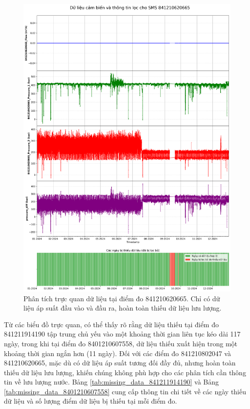 \begin{figure}[htbp]
    \centering
    \includegraphics[width=\textwidth]{image/section6_1/timeseries_combined_841210620665.png}
    \caption{Phân tích trực quan dữ liệu tại điểm đo 841210620665. Chỉ có dữ liệu áp suất đầu vào và đầu ra, hoàn toàn thiếu dữ liệu lưu lượng.}
    \label{fig:no_flow_data_841210620665}
\end{figure}

Từ các biểu đồ trực quan, có thể thấy rõ rằng dữ liệu thiếu tại điểm đo 841211914190 tập trung chủ yếu vào một khoảng thời gian liên tục kéo dài 117 ngày, trong khi tại điểm đo 8401210607558, dữ liệu thiếu xuất hiện trong một khoảng thời gian ngắn hơn (11 ngày). Đối với các điểm đo 841210802047 và 841210620665, mặc dù có dữ liệu áp suất tương đối đầy đủ, nhưng hoàn toàn thiếu dữ liệu lưu lượng, khiến chúng không phù hợp cho các phân tích cần thông tin về lưu lượng nước. Bảng \ref{tab:missing_data_841211914190} và Bảng \ref{tab:missing_data_8401210607558} cung cấp thông tin chi tiết về các ngày thiếu dữ liệu và số lượng điểm dữ liệu bị thiếu tại mỗi điểm đo.

